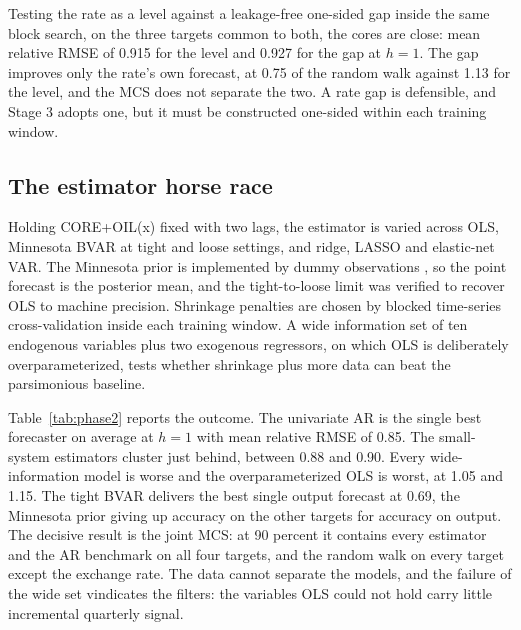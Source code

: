 \documentclass[conference]{IEEEtran}
\begin{document}
Testing the rate as a level against a leakage-free one-sided gap inside the same block search, on the three targets common to both, the cores are close: mean relative RMSE of 0.915 for the level and 0.927 for the gap at $h=1$. The gap improves only the rate's own forecast, at 0.75 of the random walk against 1.13 for the level, and the MCS does not separate the two. A rate gap is defensible, and Stage 3 adopts one, but it must be constructed one-sided within each training window.

\subsection{The estimator horse race}
Holding CORE+OIL(x) fixed with two lags, the estimator is varied across OLS, Minnesota BVAR at tight and loose settings, and ridge, LASSO and elastic-net VAR. The Minnesota prior is implemented by dummy observations \cite{bgr2010}, so the point forecast is the posterior mean, and the tight-to-loose limit was verified to recover OLS to machine precision. Shrinkage penalties are chosen by blocked time-series cross-validation inside each training window. A wide information set of ten endogenous variables plus two exogenous regressors, on which OLS is deliberately overparameterized, tests whether shrinkage plus more data can beat the parsimonious baseline.

Table~\ref{tab:phase2} reports the outcome. The univariate AR is the single best forecaster on average at $h=1$ with mean relative RMSE of 0.85. The small-system estimators cluster just behind, between 0.88 and 0.90. Every wide-information model is worse and the overparameterized OLS is worst, at 1.05 and 1.15. The tight BVAR delivers the best single output forecast at 0.69, the Minnesota prior giving up accuracy on the other targets for accuracy on output. The decisive result is the joint MCS: at 90 percent it contains every estimator and the AR benchmark on all four targets, and the random walk on every target except the exchange rate. The data cannot separate the models, and the failure of the wide set vindicates the filters: the variables OLS could not hold carry little incremental quarterly signal.
\end{document}
